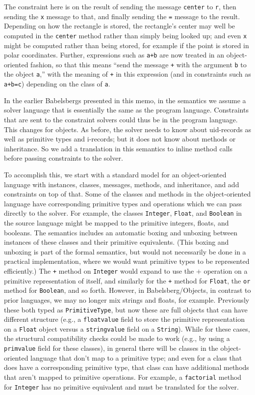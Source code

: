\documentclass{article}
\begin{document}
The constraint here is on the result of sending the message
\verb|center| to \verb|r|, then sending the \verb|x| message to that,
and finally sending the \verb|=| message to the result.  Depending on
how the rectangle is stored, the rectangle's center may well be
computed in the \verb|center| method rather than simply being looked
up; and even \verb|x| might be computed rather than being stored, for
example if the point is stored in polar coordinates.  Further,
expressions such as \verb|a+b| are now treated in an object-oriented
fashion, so that this means ``send the message \verb|+| with the
argument \verb|b| to the object \verb|a|,'' with the meaning of
\verb|+| in this expression (and in constraints such as \verb|a+b=c|)
depending on the class of \verb|a|.

In the earlier Babelsbergs presented in this memo, in the semantics we
assume a solver language that is essentially the same as the program
language. Constraints that are sent to the constraint solvers could
thus be in the program language. This changes for objects. As before,
the solver needs to know about uid-records as well as primitive types
and i-records; but it does not know about methods or inheritance. So
we add a translation in this semantics to inline method calls before
passing constraints to the solver.

To accomplish this, we start with a standard model for an
object-oriented language with instances, classes, messages, methods,
and inheritance, and add constraints on top of that.  Some of the
classes and methods in the object-oriented language have corresponding
primitive types and operations which we can pass directly to the
solver. For example, the classes \verb|Integer|, \verb|Float|, and
\verb|Boolean| in the source language might be mapped to the primitive
integers, floats, and booleans. The semantics includes an automatic
boxing and unboxing between instances of these classes and their
primitive equivalents.  (This boxing and unboxing is part of the
formal semantics, but would not necessarily be done in a practical
implementation, where we would want primitive types to be represented
efficiently.)  The \verb|+| method on \verb|Integer| would expand to
use the $+$ operation on a primitive representation of itself, and
similarly for the \verb|+| method for \verb|Float|, the \verb|or|
method for \verb|Boolean|, and so forth. However, in
Babelsberg/Objects, in contrast to prior languages, we may no longer
mix strings and floats, for example. Previously these both typed as
\verb|PrimitiveType|, but now these are full objects that can have
different structure (e.g., a \verb|floatvalue| field to store the
primitive representation on a \verb|Float| object versus a
\verb|stringvalue| field on a \verb|String|). While for these cases,
the structural compatibility checks could be made to work (e.g., by
using a \verb|primvalue| field for these classes), in general there
will be classes in the object-oriented language that don't map to a
primitive type; and even for a class that does have a corresponding
primitive type, that class can have additional methods that aren't
mapped to primitive operations. For example, a \verb|factorial| method
for \verb|Integer| has no primitive equivalent and must be
translated for the solver.
\end{document}
